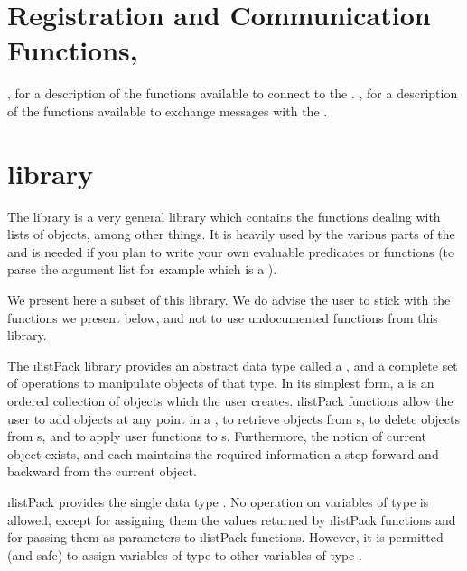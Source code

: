 \section{Registration and Communication Functions, \protect{}}

, for a description of the
functions available to connect to the \MPA{}. , for a
description of the functions available to exchange messages with the \MPA{}.

\section{\protect{} library}

The  library is a very general library which contains the
functions dealing with lists of objects, among other things. It is
heavily used by the various parts of the \COPRSDE{} and is needed if you
plan to write your own evaluable predicates or functions (to parse the
argument list for example which is a ).

We present here a subset of this library. We do advise the user to
stick with the functions we present below, and not to use
undocumented functions from this library.

The \i{listPack} library provides an abstract data type called a
, and a complete set of operations to manipulate objects of that
type. In its simplest form, a  is an ordered collection of
objects which the user creates. \i{listPack} functions allow the user to
add objects at any point in a , to retrieve objects from
s, to delete objects from s, and to apply user
functions to
s.  Furthermore, the notion of current object exists, and
each  maintains the required information a step forward and
backward
from the current object.

\i{listPack} provides the single data type . No operation on
variables of type  is allowed, except for assigning them the
values returned by \i{listPack} functions and for passing them as
parameters to \i{listPack} functions. However, it is permitted (and safe)
to
assign variables of type  to other variables of type
.



